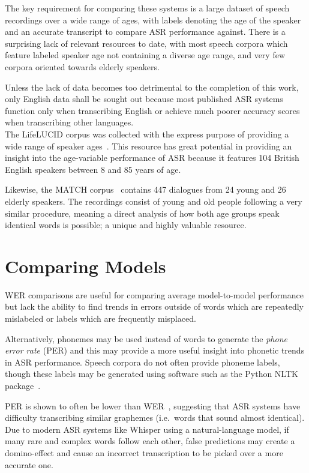The key requirement for comparing these systems is a large dataset of speech recordings over a
wide range of ages, with labels denoting the age of the speaker and an accurate transcript to
compare ASR performance against.
There is a surprising lack of relevant resources to date, with most speech corpora which feature
labeled speaker age not containing a diverse age range, and very few corpora oriented towards
elderly speakers.

Unless the lack of data becomes too detrimental to the completion of this work, only English data
shall be sought out because most published ASR systems function only when transcribing English
or achieve much poorer accuracy scores when transcribing other languages.\\

The LifeLUCID corpus was collected with the express purpose of providing a wide range of
speaker ages~\cite{lifelucid}.
This resource has great potential in providing an insight into the age-variable performance of
ASR because it features 104 British English speakers between 8 and 85 years of age.

Likewise, the MATCH corpus~\cite{Georgila2010Sep} contains 447 dialogues from 24 young and 26
elderly speakers.
The recordings consist of young and old people following a very similar procedure, meaning a
direct analysis of how both age groups speak identical words is possible;
a unique and highly valuable resource.

\section{Comparing Models}\label{sec:comparing-models}

WER comparisons are useful for comparing average model-to-model performance but lack the ability
to find trends in errors outside of words which are repeatedly mislabeled or labels which are
frequently misplaced.

Alternatively, phonemes may be used instead of words to generate the \emph{phone error rate}
(PER) and this may provide a more useful insight into phonetic trends in ASR performance.
Speech corpora do not often provide phoneme labels, though these labels may be generated using
software such as the Python NLTK package~\cite{nltk}.

PER is shown to often be lower than WER~\cite{fang2020}, suggesting that ASR systems have
difficulty transcribing similar graphemes (i.e.\ words that sound almost identical).
Due to modern ASR systems like Whisper using a natural-language model, if many rare and complex
words follow each other, false predictions may create a domino-effect and cause an incorrect
transcription to be picked over a more accurate one.

